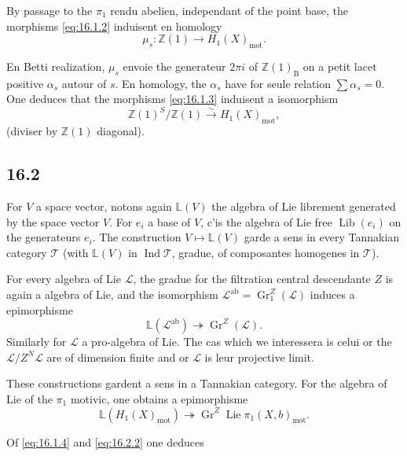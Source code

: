 \documentclass[12pt,a4paper]{article}
\theoremstyle{plain}
\theoremstyle{definition}
\theoremstyle{remark}
\DeclareMathOperator{\Gr}{Gr}
\DeclareMathOperator{\Lib}{Lib}
\DeclareMathOperator{\Lie}{Lie}
\newcommand{\bZ}{\mathbb{Z}}
\newcommand{\LL}{\mathbb{L}}
\DeclareMathOperator{\Ind}{Ind}
\newcommand{\B}{\mathrm{B}}
\newcommand{\mot}{\mathrm{mot}}
\begin{document}
By passage to the $\pi_1$ rendu abelien, independant of the point base, the morphisms \eqref{eq:16.1.2} induisent en homology
\begin{equation}\label{eq:16.1.3}
\mu_s: \bZ(1) \to H_1(X)_{\mot}.
\end{equation}

En Betti realization, $\mu_s$ envoie the generateur $2\pi i$ of $\bZ(1)_{\B}$ on a petit lacet positive $\alpha_s$ autour of $s$. En homology, the $\alpha_s$ have for seule relation $\sum \alpha_s = 0$. One deduces that the morphisms \eqref{eq:16.1.3} induisent a isomorphism
\begin{equation}\label{eq:16.1.4}
\bZ(1)^S / \bZ(1) \xrightarrow{\sim} H_1(X)_{\mot},
\end{equation}
(diviser by $\bZ(1)$ diagonal).

\subsection*{16.2}

For $V$ a space vector, notons again $\LL(V)$ the algebra of Lie librement generated by the space vector $V$. For $e_i$ a base of $V$, c'is the algebra of Lie free $\Lib(e_i)$ on the generateurs $e_i$. The construction $V \mapsto \LL(V)$ garde a sens in every Tannakian category $\mathcal{T}$ (with $\LL(V)$ in $\Ind \mathcal{T}$, gradue, of composantes homogenes in $\mathcal{T}$).

For every algebra of Lie $\mathcal{L}$, the gradue for the filtration central descendante $Z$ is again a algebra of Lie, and the isomorphism $\mathcal{L}^{\text{ab}} = \Gr_1^Z(\mathcal{L})$ induces a epimorphisme
\begin{equation}\label{eq:16.2.1}
\LL(\mathcal{L}^{\text{ab}}) \twoheadrightarrow \Gr^Z(\mathcal{L}).
\end{equation}
Similarly for $\mathcal{L}$ a pro-algebra of Lie. The cas which we interessera is celui or the $\mathcal{L}/Z^N \mathcal{L}$ are of dimension finite and or $\mathcal{L}$ is leur projective limit.

These constructions gardent a sens in a Tannakian category. For the algebra of Lie of the $\pi_1$ motivic, one obtains a epimorphisme
\begin{equation}\label{eq:16.2.2}
\LL(H_1(X)_{\mot}) \twoheadrightarrow \Gr^Z \Lie \pi_1(X, b)_{\mot}.
\end{equation}

Of \eqref{eq:16.1.4} and \eqref{eq:16.2.2} one deduces
\end{document}
